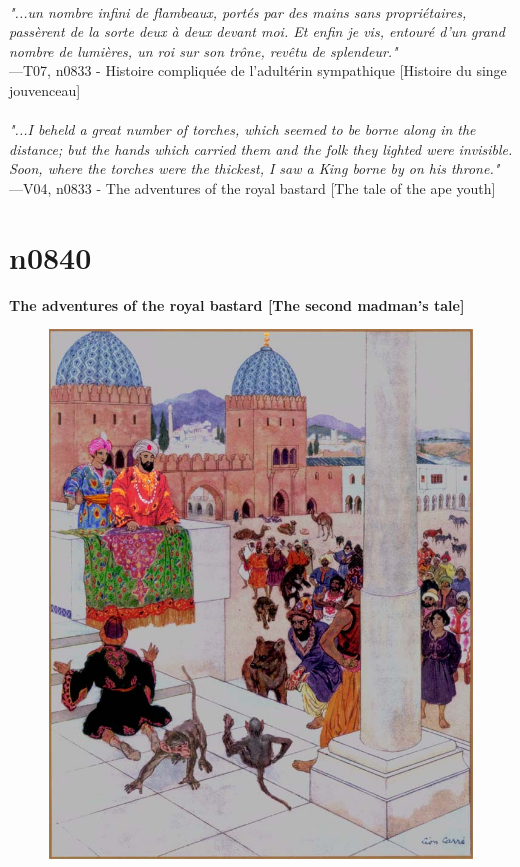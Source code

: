 \documentclass[../Carre_nights.tex]{subfiles}
\begin{document}
\textit{\\
"...un nombre infini de flambeaux, portés par des mains sans propriétaires, passèrent de la sorte deux à deux devant moi. Et enfin je vis, entouré d’un grand nombre de lumières, un roi sur son trône, revêtu de splendeur."} \\
—T07, n0833 - Histoire compliquée de l’adultérin sympathique [Histoire du singe jouvenceau] \\~\\
\textit{"...I beheld a great number of torches, which seemed to be borne along in the distance; but the hands which carried them and the folk they lighted were invisible. Soon, where the torches were the thickest, I saw a King borne by on his throne."} \\
—V04, n0833 - The adventures of the royal bastard [The tale of the ape youth]

\newpage

\section{n0840}
\textbf{\Large{The adventures of the royal bastard [The second madman’s tale]}} \\

\begin{figure}[ht]
\centering
\includegraphics[height=\figsize]{illustrations/volume_7/T07, n0840 - Histoire compliquée de l’adultérin sympathique [Histoire du deuxième fou].jpg}
\end{figure}
\end{document}

